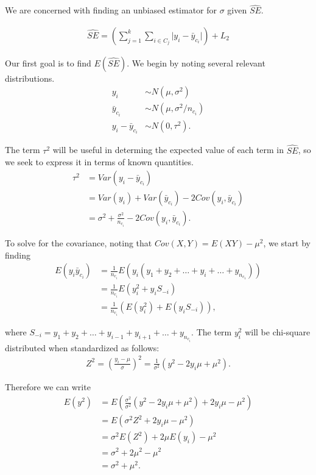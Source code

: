 \documentclass[USenglish,oneside]{article}
\newcounter{ab}
\newcounter{ar}
\newcounter{igh}
\newcounter{ms}
\begin{document}
We are concerned with finding an unbiased estimator for $\sigma$ given $\widehat{SE}$.

\begin{align}
\widehat{SE} = \left(\sum_{j=1}^k \sum_{i \in C_j} \lvert y_i - \bar{y}_{c_i} \rvert \right) + L_2 \label{eq:se}
\end{align}

Our first goal is to find $E(\widehat{SE})$. We begin by noting several relevant distributions.
\begin{align*}
y_i &\sim N(\mu, \sigma^2) \\
\bar{y}_{c_i} &\sim N(\mu, \sigma^2/n_{c_i}) \\
y_i - \bar{y}_{c_i} &\sim N(0, \tau^2).
\end{align*}

The term $\tau^2$ will be useful in determing the expected value of each term in $\widehat{SE}$, so we seek to express it in terms of known quantities.
\begin{align}
\tau^2 &= Var(y_i - \bar{y}_{c_i}) \nonumber \\
&= Var(y_i) + Var(\bar{y}_{c_i}) - 2 Cov(y_i, \bar{y}_{c_i}) \nonumber \\
&= \sigma^2 + \frac{\sigma^2}{n_{c_i}} - 2 Cov(y_i, \bar{y}_{c_i}). \label{eq:tau}
\end{align}

To solve for the covariance, noting that $Cov(X,Y) = E(XY) - \mu^2$, we start by finding
\begin{align}
E(y_i \bar{y}_{c_i}) &= \frac{1}{n_{c_i}} E(y_i (y_1 + y_2 + \ldots + y_i + \ldots + y_{n_{c_1}})) \nonumber \\
&= \frac{1}{n_{c_i}} E(y_i^2 + y_i S_{-i}) \nonumber \\
&= \frac{1}{n_{c_i}}\left( E\left(y_i^2\right) + E\left(y_i S_{-i}\right)\right), \label{eq:eyy}
\end{align}

where $S_{-i} = y_1 + y_2 + \ldots + y_{i-1} + y_{i+1} + \ldots + y_{n_{c_i}}$. The term $y_i^2$ will be chi-square distributed when standardized as follows:
\begin{align*}
Z^2 = \left(\frac{y_i - \mu}{\sigma}\right)^2 = \frac{1}{\sigma^2}\left(y^2 - 2y_i\mu + \mu^2\right).
\end{align*}

\noindent Therefore we can write
\begin{align*}
E(y^2) &= E\left(\frac{\sigma^2}{\sigma^2} \left(y^2 - 2y_i\mu + \mu^2\right) + 2y_i\mu - \mu^2\right) \\
&= E\left(\sigma^2 Z^2 + 2y_i\mu - \mu^2\right) \\
&= \sigma^2E(Z^2) + 2\mu E(y_i) - \mu^2 \\
&= \sigma^2 + 2\mu^2 - \mu^2 \\
&= \sigma^2 + \mu^2.
\end{align*}
\end{document}
